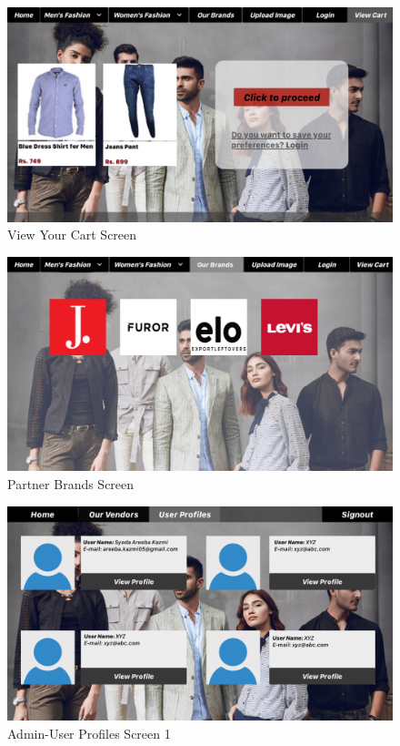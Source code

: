   \begin{figure}[H]
  \includegraphics[width=15cm]{images/ViewCart.pdf} 
  \centering
  \caption{View Your Cart Screen}
  \label{gui:cart}
  \end{figure}

  \begin{figure}[H]
  \includegraphics[width=15cm]{images/OurBrands.pdf} 
  \centering
  \caption{Partner Brands Screen}
  \label{gui:brands}
  \end{figure}

   \begin{figure}[H]
  \includegraphics[width=15cm]{images/Profiles1.pdf} 
  \centering
  \caption{Admin-User Profiles Screen 1}
  \label{gui:profiles1}
  \end{figure}

